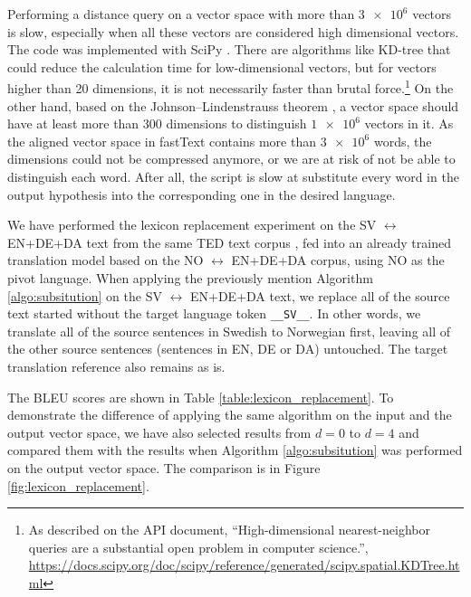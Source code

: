 \documentclass[thesis,fonts=libertine]{cluu}
\begin{document}
Performing a distance query on a vector space with more than $\num{3e6}$ vectors is slow, especially when all these vectors are considered high dimensional vectors. The code was implemented with SciPy \parencite{Virtanen:2019aa}. There are algorithms like KD-tree \parencite{Maneewongvatana:aa} that could reduce the calculation time for low-dimensional vectors, but for vectors higher than 20 dimensions, it is not necessarily faster than brutal force.\footnote{As described on the API document, ``High-dimensional nearest-neighbor queries are a substantial open problem in computer science.'', \url{https://docs.scipy.org/doc/scipy/reference/generated/scipy.spatial.KDTree.html}} On the other hand, based on the Johnson–Lindenstrauss theorem \parencite{johnson1984extensions}, a vector space should have at least more than 300 dimensions to distinguish $\num{1e6}$ vectors in it. As the aligned vector space in fastText contains more than $\num{3e6}$ words, the dimensions could not be compressed anymore, or we are at risk of not be able to distinguish each word. After all, the script is slow at substitute every word in the output hypothesis into the corresponding one in the desired language.

We have performed the lexicon replacement experiment on the SV $\leftrightarrow$ EN+DE+DA text from the same TED text corpus \parencite{Qi:2018aa}, fed into an already trained translation model based on the NO $\leftrightarrow$ EN+DE+DA corpus, using NO as the pivot language. When applying the previously mention Algorithm \ref{algo:subsitution} on the SV $\leftrightarrow$ EN+DE+DA text, we replace all of the source text started without the target language token \verb|__SV__|. In other words, we translate all of the source sentences in Swedish to Norwegian first, leaving all of the other source sentences (sentences in EN, DE or DA) untouched. The target translation reference also remains as is. 

The BLEU scores are shown in Table \ref{table:lexicon_replacement}. To demonstrate the difference of applying the same algorithm on the input and the output vector space, we have also selected results from $d=0$ to $d=4$ and compared them with the results when Algorithm \ref{algo:subsitution} was performed on the output vector space. The comparison is in Figure \ref{fig:lexicon_replacement}.
\end{document}
